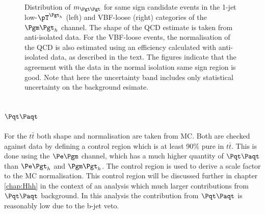 \begin{figure}[htb]
\caption[Distribution of $m_{\Pgt\Pgt}$ for same sign candidate events in the
1-jet low-$\pT^{\Pgth}$ (left) and VBF-loose (right) categories of the $\mutau$
channel.]{Distribution of $m_{\Pgt\Pgt}$ for same sign candidate events in the
1-jet low-$\pT^{\Pgth}$ (left) and VBF-loose (right) categories of the $\mutau$
channel. The shape of the QCD estimate is taken from anti-isolated data. For the
VBF-loose events, the normalisation of the QCD is also estimated using an efficiency
calculated with anti-isolated data, as described in the text. 
The figures indicate that the agreement with the data in the normal isolation same sign region is good. 
Note that here the uncertainty band includes only statistical uncertainty on the background esimate.}
\label{fig:samesign}
\end{figure}

\subsection{$\ttbar$}
\label{sec:backgroundEstimation_TT}

For the $t \bar{t}$ both shape and normalisation are taken from MC. Both are checked
against data by defining a control region which is at least 90$\%$ pure in
$t \bar{t}$. This is done using the $\emu$ channel, which has a much higher
quantity of $\ttbar$ than $\etau$ and $\mutau$. The control region is used to
derive a scale factor to the \ac{MC} normalisation. This control region will be
discussed further in chapter \ref{chap:Hhh} in the context of an analysis which
much larger contributions from $\ttbar$ background. In this analysis the
contribution from $\ttbar$ is reasonably low due to the b-jet veto.

